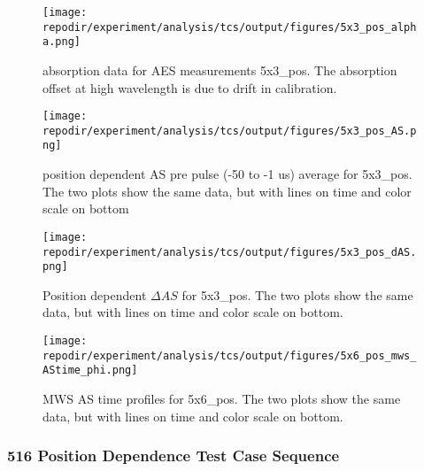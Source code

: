 \begin{figure}[]
\centering
\texttt{[image: \\repodir/experiment/analysis/tcs/output/figures/5x3\_pos\_alpha.png]}
\caption{absorption data for AES measurements 5x3\_pos. The absorption offset at high wavelength is due to drift in calibration.}
\label{fig:SI_5x3_pos_alpha}
\end{figure}






\begin{figure}[]
\centering
\texttt{[image: \\repodir/experiment/analysis/tcs/output/figures/5x3\_pos\_AS.png]}
\caption{position dependent AS pre pulse (-50 to -1 us) average for 5x3\_pos. The two plots show the same data, but with lines on time and color scale on bottom}
\label{fig:SI_5x3_pos_AS}
\end{figure}


\begin{figure}[]
    \centering
    \texttt{[image: \\repodir/experiment/analysis/tcs/output/figures/5x3\_pos\_dAS.png]} 
    \caption{Position dependent $\Delta AS$ for 5x3\_pos. The two plots show the same data, but with lines on time and color scale on bottom. }
    \label{fig:SI_5x3_pos_dAS}
\end{figure}


\begin{figure}[]
\centering
\texttt{[image: \\repodir/experiment/analysis/tcs/output/figures/5x6\_pos\_mws\_AStime\_phi.png]}
\caption{MWS AS time profiles for 5x6\_pos. The two plots show the same data, but with lines on time and color scale on bottom.}
\label{fig:SI_5x6_pos_mws_AStime_phi}
\end{figure}


\clearpage
\subsubsection{516 Position Dependence Test Case Sequence}

